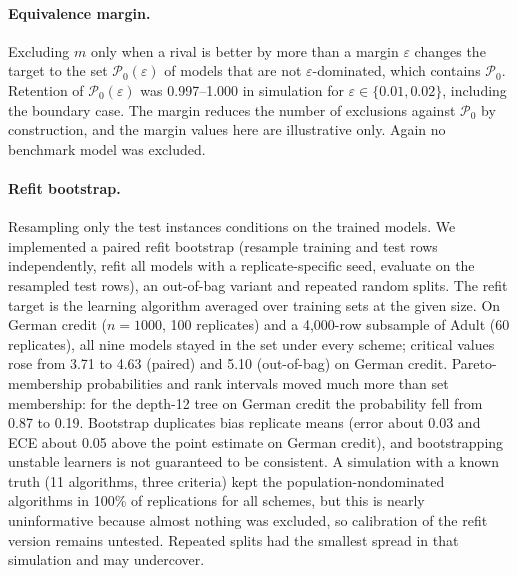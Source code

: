 \documentclass[pdflatex,sn-mathphys-num,iicol]{sn-jnl}
\theoremstyle{thmstyleone}
\theoremstyle{thmstyletwo}
\begin{document}
\paragraph{Equivalence margin.} Excluding $m$ only when a rival is better by more than a margin $\varepsilon$ changes the target to the set $\mathcal{P}_0(\varepsilon)$ of models that are not $\varepsilon$-dominated, which contains $\mathcal{P}_0$. Retention of $\mathcal{P}_0(\varepsilon)$ was 0.997--1.000 in simulation for $\varepsilon\in\{0.01,0.02\}$, including the boundary case. The margin reduces the number of exclusions against $\mathcal{P}_0$ by construction, and the margin values here are illustrative only. Again no benchmark model was excluded.

\paragraph{Refit bootstrap.} Resampling only the test instances conditions on the trained models. We implemented a paired refit bootstrap (resample training and test rows independently, refit all models with a replicate-specific seed, evaluate on the resampled test rows), an out-of-bag variant and repeated random splits. The refit target is the learning algorithm averaged over training sets at the given size. On German credit ($n=1000$, 100 replicates) and a 4,000-row subsample of Adult (60 replicates), all nine models stayed in the set under every scheme; critical values rose from 3.71 to 4.63 (paired) and 5.10 (out-of-bag) on German credit. Pareto-membership probabilities and rank intervals moved much more than set membership: for the depth-12 tree on German credit the probability fell from 0.87 to 0.19. Bootstrap duplicates bias replicate means (error about 0.03 and ECE about 0.05 above the point estimate on German credit), and bootstrapping unstable learners is not guaranteed to be consistent. A simulation with a known truth (11 algorithms, three criteria) kept the population-nondominated algorithms in 100\% of replications for all schemes, but this is nearly uninformative because almost nothing was excluded, so calibration of the refit version remains untested. Repeated splits had the smallest spread in that simulation and may undercover.
\end{document}
